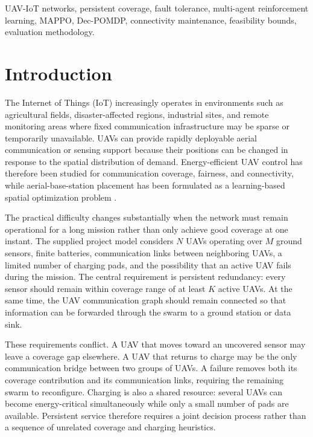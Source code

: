 \documentclass[conference]{IEEEtran}
\begin{document}


\begin{IEEEkeywords}
UAV-IoT networks, persistent coverage, fault tolerance, multi-agent reinforcement learning, MAPPO, Dec-POMDP, connectivity maintenance, feasibility bounds, evaluation methodology.
\end{IEEEkeywords}

\section{Introduction}
The Internet of Things (IoT) increasingly operates in environments such as agricultural fields, disaster-affected regions, industrial sites, and remote monitoring areas where fixed communication infrastructure may be sparse or temporarily unavailable. UAVs can provide rapidly deployable aerial communication or sensing support because their positions can be changed in response to the spatial distribution of demand. Energy-efficient UAV control has therefore been studied for communication coverage, fairness, and connectivity, while aerial-base-station placement has been formulated as a learning-based spatial optimization problem \cite{liu2018,qiu2019}.

The practical difficulty changes substantially when the network must remain operational for a long mission rather than only achieve good coverage at one instant. The supplied project model considers $N$ UAVs operating over $M$ ground sensors, finite batteries, communication links between neighboring UAVs, a limited number of charging pads, and the possibility that an active UAV fails during the mission. The central requirement is persistent redundancy: every sensor should remain within coverage range of at least $K$ active UAVs. At the same time, the UAV communication graph should remain connected so that information can be forwarded through the swarm to a ground station or data sink.

These requirements conflict. A UAV that moves toward an uncovered sensor may leave a coverage gap elsewhere. A UAV that returns to charge may be the only communication bridge between two groups of UAVs. A failure removes both its coverage contribution and its communication links, requiring the remaining swarm to reconfigure. Charging is also a shared resource: several UAVs can become energy-critical simultaneously while only a small number of pads are available. Persistent service therefore requires a joint decision process rather than a sequence of unrelated coverage and charging heuristics.
\end{document}
